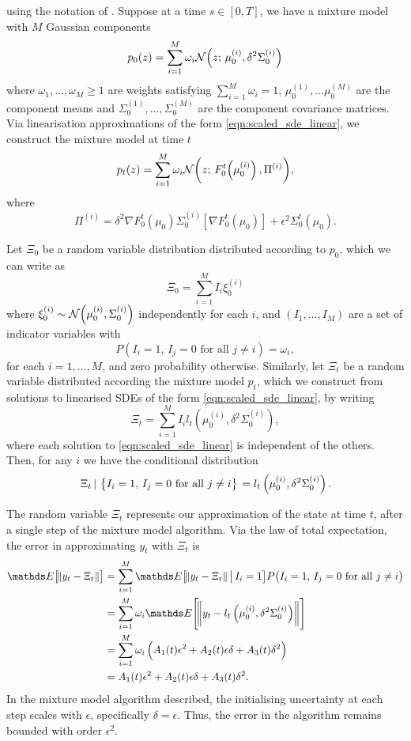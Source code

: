 using the notation of .
Suppose at a time \(s \in [0,T]\), we have a mixture model with \(M\) Gaussian components
\[
	p_0\!\left(z\right) = \sum_{i=1}^{M}{\omega_i\mathcal{N}\!\left(z;\, \mu_0^{(i)}, \delta^2\Sigma_0^{(i)}\right)}
\]
where \(\omega_1,\dotsc, \omega_M \geq 1\) are weights satisfying \(\sum_{i=1}^M{\omega_i} = 1\), \(\mu_0^{(1)}, \dots \mu_0^{(M)}\) are the component means and \(\Sigma_0^{(1)}, \dotsc, \Sigma_0^{(M)}\) are the component covariance matrices.
Via linearisation approximations of the form \eqref{eqn:scaled_sde_linear}, we construct the mixture model at time \(t\)
\[
	p_t\!\left(z\right) = \sum_{i=1}^{M}{\omega_i\mathcal{N}\!\left(z; \, F_0^t\!\left(\mu_0^{(i)}\right), \Pi^{(i)}\right)},
\]
where
\[
	\Pi^{(i)} = \delta^2 \nabla F_0^t\!\left(\mu_0\right) \Sigma_0^{(i)} \left[\nabla F_0^t\!\left(\mu_0\right)\right] + \epsilon^2 \Sigma_0^t\!\left(\mu_0\right).
\]

Let \(\Xi_0\) be a random variable distribution distributed according to \(p_0\), which we can write as
\[
	\Xi_0 = \sum_{i=1}^{M}{I_i \xi_0^{(i)}}
\]
where \(\xi_0^{(i)} \sim\mathcal{N}\!\left(\mu_0^{(i)}, \Sigma_0^{(i)}\right)\) independently for each \(i\), and \(\left(I_1, \dotsc, I_M\right)\) are a set of indicator variables with
\[
	P\!\left(I_i = 1,\, I_j = 0 \text{ for all } j \neq i\right) = \omega_i,
\]
for each \(i = 1,\hdots,M\), and zero probability otherwise.
Similarly, let \(\Xi_t\) be a random variable distributed according the mixture model \(p_t\), which we construct from solutions to linearised SDEs of the form \eqref{eqn:scaled_sde_linear}, by writing
\[
	\Xi_t = \sum_{i=1}^{M}{I_i l_t\!\left(\mu_0^{(i)}, \delta^2\Sigma_0^{(i)}\right)},
\]
where each solution to \eqref{eqn:scaled_sde_linear} is independent of the others.
Then, for any \(i\) we have the conditional distribution
\[
	\left. \Xi_t \, | \, \set{I_i = 1, \, I_j = 0 \text{ for all } j \neq i} \right. = l_{t}\left(\mu_0^{(i)}, \delta^2 \Sigma_0^{(i)}\right).
\]

The random variable \(\Xi_t\) represents our approximation of the state at time \(t\), after a single step of the mixture model algorithm.
Via the law of total expectation, the error in approximating \(y_t\) with \(\Xi_t\) is
\begin{align*}
	\avg{\norm{y_t - \Xi_t}} & = \sum_{i=1}^{M}{\avg{\norm{y_t - \Xi_t}\,\middle|\, I_i = 1}}P\!\left(I_i = 1,\, I_j = 0 \text{ for all } j \neq i\right) \\
		& = \sum_{i=1}^{M}{\omega_i\avg{\norm{y_t - l_{t}\left(\mu_0^{(i)}, \delta^2 \Sigma_0^{(i)}\right)}}} \\
		& = \sum_{i=1}^{M}{\omega_i\left(A_1(t)\epsilon^2 + A_2(t) \epsilon \delta + A_3(t)\delta^2\right)} \\
		& = A_1(t) \epsilon^2 + A_2(t)\epsilon\delta + A_3(t)\delta^2.
\end{align*}
In the mixture model algorithm described, the initialising uncertainty at each step scales with \(\epsilon\), specifically \(\delta = \epsilon\).
Thus, the error in the algorithm remains bounded with order \(\epsilon^2\).


